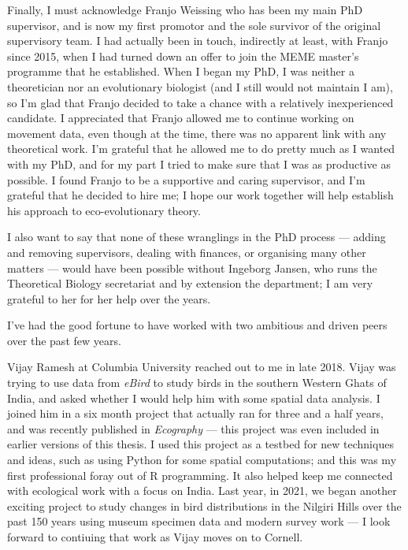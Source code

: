 Finally, I must acknowledge Franjo Weissing who has been my main PhD supervisor, and is now my first promotor and the sole survivor of the original supervisory team.
I had actually been in touch, indirectly at least, with Franjo since 2015, when I had turned down an offer to join the MEME master's programme that he established.
When I began my PhD, I was neither a theoretician nor an evolutionary biologist (and I still would not maintain I am), so I'm glad that Franjo decided to take a chance with a relatively inexperienced candidate.
I appreciated that Franjo allowed me to continue working on movement data, even though at the time, there was no apparent link with any theoretical work.
I'm grateful that he allowed me to do pretty much as I wanted with my PhD, and for my part I tried to make sure that I was as productive as possible.
I found Franjo to be a supportive and caring supervisor, and I'm grateful that he decided to hire me; I hope our work together will help establish his approach to eco-evolutionary theory.

I also want to say that none of these wranglings in the PhD process --- adding and removing supervisors, dealing with finances, or organising many other matters --- would have been possible without Ingeborg Jansen, who runs the Theoretical Biology secretariat and by extension the department; I am very grateful to her for her help over the years.

\medskip

I've had the good fortune to have worked with two ambitious and driven peers over the past few years.

\noindent Vijay Ramesh at Columbia University reached out to me in late 2018.
Vijay was trying to use data from \textit{eBird} to study birds in the southern Western Ghats of India, and asked whether I would help him with some spatial data analysis.
I joined him in a six month project that actually ran for three and a half years, and was recently published in \textit{Ecography} --- this project was even included in earlier versions of this thesis.
I used this project as a testbed for new techniques and ideas, such as using Python for some spatial computations; and this was my first professional foray out of R programming.
It also helped keep me connected with ecological work with a focus on India.
Last year, in 2021, we began another exciting project to study changes in bird distributions in the Nilgiri Hills over the past 150 years using museum specimen data and modern survey work --- I look forward to contiuing that work as Vijay moves on to Cornell.

